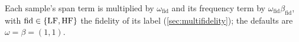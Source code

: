 Each sample's span term is multiplied by $\omega_{\mathrm{fid}}$ and its frequency term by $\omega_{\mathrm{fid}}\beta_{\mathrm{fid}}$, with $\mathrm{fid}\in\{\mathrm{LF},\mathrm{HF}\}$ the fidelity of its label (\cref{sec:multifidelity}); the defaults are $\omega=\beta=(1,1)$.
